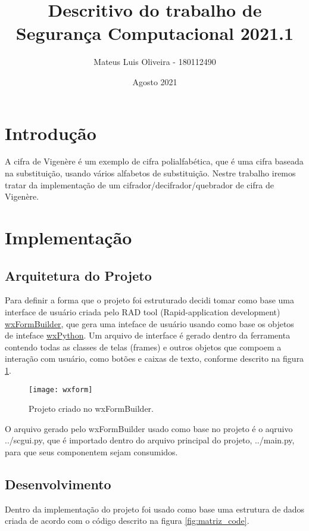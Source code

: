 \documentclass[10pt]{article}
\title{Descritivo do trabalho de Segurança Computacional 2021.1}
\author{Mateus Luis Oliveira - 180112490}
\date{Agosto 2021}
\begin{document}
\maketitle

\section{Introdução}
A cifra de Vigenère é um exemplo de cifra polialfabética, que é uma cifra baseada 
na substituição, usando vários alfabetos de substituição. Nestre trabalho iremos tratar da implementação de um cifrador/decifrador/quebrador 
de cifra de Vigenère.



\section{Implementação}

\subsection{Arquitetura do Projeto}
Para definir a forma que o projeto foi estruturado decidi tomar como base uma interface de usuário criada pelo RAD tool (Rapid-application development) 
\href{https://github.com/wxFormBuilder/wxFormBuilder}{wxFormBuilder}, que gera uma inteface de usuário usando como base os objetos de inteface
\href{https://www.wxpython.org/}{wxPython}. Um arquivo de interface é gerado dentro da ferramenta contendo todas as classes de telas (frames) e 
outros objetos que compoem a interação com usuário, como botões e caixas de texto, conforme descrito na figura \ref{fig:wxform}.

\begin{figure}[h]
  \texttt{[image: wxform]}
  \centering
  \caption{Projeto criado no wxFormBuilder.}
  \label{fig:wxform}
\end{figure}
O arquivo gerado pelo wxFormBuilder usado como base no projeto é o aqruivo ../scgui.py, que é importado dentro do arquivo principal do projeto,
../main.py, para que seus componentem sejam consumidos.

\subsection{Desenvolvimento}


Dentro da implementação do projeto foi usado como base uma estrutura de dados
criada de acordo com o código descrito na figura \ref{fig:matriz_code}.
\end{document}
